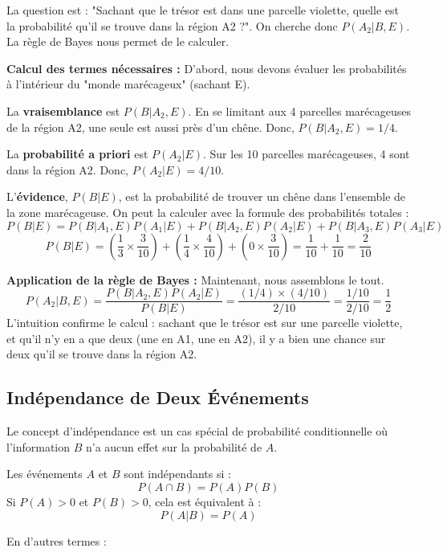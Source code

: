 \begin{intuitionbox}
La question est : "Sachant que le trésor est dans une parcelle violette, quelle est la probabilité qu'il se trouve dans la région A2 ?". On cherche donc $P(A_2 | B, E)$. La règle de Bayes nous permet de le calculer.

\textbf{Calcul des termes nécessaires :} D'abord, nous devons évaluer les probabilités à l'intérieur du "monde marécageux" (sachant E).

La \textbf{vraisemblance} est $P(B|A_2, E)$. En se limitant aux 4 parcelles marécageuses de la région A2, une seule est aussi près d'un chêne. Donc, $P(B|A_2, E) = 1/4$.

La \textbf{probabilité a priori} est $P(A_2|E)$. Sur les 10 parcelles marécageuses, 4 sont dans la région A2. Donc, $P(A_2|E) = 4/10$.

L'\textbf{évidence}, $P(B|E)$, est la probabilité de trouver un chêne dans l'ensemble de la zone marécageuse. On peut la calculer avec la formule des probabilités totales :
$$P(B|E) = P(B|A_1, E)P(A_1|E) + P(B|A_2, E)P(A_2|E) + P(B|A_3, E)P(A_3|E)$$
$$P(B|E) = (\frac{1}{3} \times \frac{3}{10}) + (\frac{1}{4} \times \frac{4}{10}) + (0 \times \frac{3}{10}) = \frac{1}{10} + \frac{1}{10} = \frac{2}{10}$$

\textbf{Application de la règle de Bayes :} Maintenant, nous assemblons le tout.
$$P(A_2|B, E) = \frac{P(B|A_2, E)P(A_2|E)}{P(B|E)} = \frac{(1/4) \times (4/10)}{2/10} = \frac{1/10}{2/10} = \frac{1}{2}$$
L'intuition confirme le calcul : sachant que le trésor est sur une parcelle violette, et qu'il n'y en a que deux (une en A1, une en A2), il y a bien une chance sur deux qu'il se trouve dans la région A2.
\end{intuitionbox}

\subsection{Indépendance de Deux Événements}

Le concept d'indépendance est un cas spécial de probabilité conditionnelle où l'information $B$ n'a aucun effet sur la probabilité de $A$.

\begin{definitionbox}
Les événements $A$ et $B$ sont indépendants si :
$$P(A \cap B) = P(A)P(B)$$
Si $P(A) > 0$ et $P(B) > 0$, cela est équivalent à :
$$P(A|B) = P(A)$$
\end{definitionbox}

En d'autres termes :

